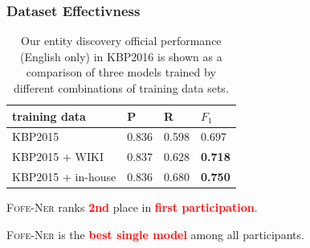 \documentclass{beamer}
\begin{document}
\begin{frame}
\frametitle{Dataset Effectivness}
\begin{table}
	\centering
	\begin{tabular}{|l|ll|l|}
		\hline
		training data & P  & R & $F_1$ \\ \hline \hline
		KBP2015 & 0.836 & 0.598 & 0.697 \\
		KBP2015 + WIKI &  0.837 & 0.628 & \bf 0.718 \\
		KBP2015 + in-house & 0.836 & 0.680 & \bf 0.750 \\ 
		\hline
	\end{tabular}
	\caption{\scriptsize Our entity discovery official performance (English only) in KBP2016 is shown as a comparison of three models trained by different combinations of training data sets. }
	\label{tbl:kbp2016dataset}	
\end{table}
\begin{alertblock}{}
	\small
	\textsc{Fofe-Ner} ranks \textcolor{red}{\textbf{2nd}} place in \textcolor{red}{\textbf{first participation}}.
\end{alertblock}
\begin{alertblock}{}
	\small
	\textsc{Fofe-Ner} is the \textcolor{red}{\textbf{best single model}} among all participants.
\end{alertblock}
\end{frame}



\end{document}
